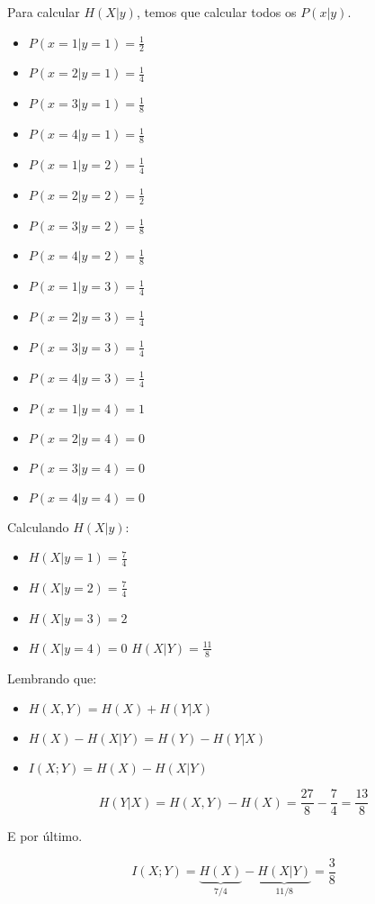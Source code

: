 Para calcular $H(X|y)$, temos que calcular todos os $P(x|y)$.

\begin{itemize}
	\item $P(x = 1|y = 1) = \frac{1}{2}$
	\bigskip
	\item $P(x = 2|y = 1) = \frac{1}{4}$
	\bigskip
	\item $P(x = 3|y = 1) = \frac{1}{8}$
	\bigskip
	\item $P(x = 4|y = 1) = \frac{1}{8}$
	\bigskip
	\item $P(x = 1|y = 2) = \frac{1}{4}$
	\bigskip
	\item $P(x = 2|y = 2) = \frac{1}{2}$
	\bigskip
	\item $P(x = 3|y = 2) = \frac{1}{8}$
	\bigskip
	\item $P(x = 4|y = 2) = \frac{1}{8}$
	\bigskip
	\item $P(x = 1|y = 3) = \frac{1}{4}$
	\bigskip
	\item $P(x = 2|y = 3) = \frac{1}{4}$
	\bigskip
	\item $P(x = 3|y = 3) = \frac{1}{4}$
	\bigskip
	\item $P(x = 4|y = 3) = \frac{1}{4}$
	\bigskip
	\item $P(x = 1|y = 4) = 1$
	\bigskip
	\item $P(x = 2|y = 4) = 0$
	\bigskip
	\item $P(x = 3|y = 4) = 0$
	\bigskip
	\item $P(x = 4|y = 4) = 0$
	\bigskip
\end{itemize}

Calculando $H(X|y)$:

\begin{itemize}
	\item $H(X|y = 1) = \frac{7}{4}$
	\bigskip
	\item $H(X|y = 2) = \frac{7}{4}$
	\bigskip
	\item $H(X|y = 3) = 2$
	\bigskip
	\item $H(X|y = 4) = 0$
	\bigskip
	$H(X|Y) = \frac{11}{8}$
\end{itemize}

Lembrando que:

\begin{itemize}
    \item $H(X,Y) = H(X) + H(Y|X)$
    \item $H(X) - H(X|Y) = H(Y) - H(Y | X)$
    \item $I(X;Y) = H(X) - H(X|Y)$
\end{itemize}

\[H(Y|X) = H(X,Y) - H(X) = \frac{{27}}{8} - \frac{7}{4} = \frac{{13}}{8}\]

E por último.

\[I(X;Y) = \underbrace {H(X)}_{7/4} - \underbrace {H(X|Y)}_{11/8} = \frac{3}{8}\]

